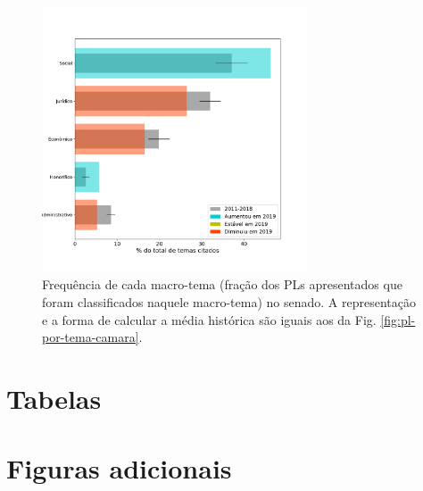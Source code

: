 \documentclass[12pt,a4paper]{article}
\newcommand{\HX}[1]{{\centering\color{red}\large<#1>}}
\begin{document}
\begin{figure}[H]
\centering
\includegraphics[width=0.7\textwidth]{graficos/senado/pls-macro-temas-senado-r-completo.pdf}
\caption{Frequência de cada macro-tema (fração dos PLs apresentados que foram classificados
  naquele macro-tema) no senado. A representação e a forma de calcular a média histórica são iguais
  aos da Fig. \ref{fig:pl-por-tema-camara}.}
\label{fig:pl-por-macrotema-senado}
\end{figure}

\HX{Incluir tabela com dados sobre temas}

\section{Tabelas}
{\footnotesize

}


\section{Figuras adicionais}
\end{document}

